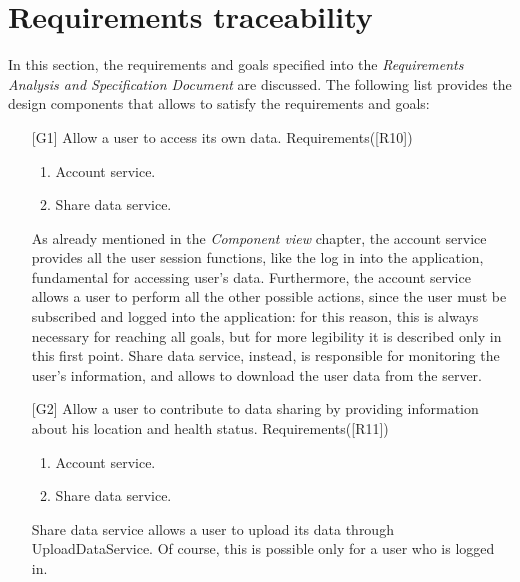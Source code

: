 \section{Requirements traceability}
In this section, the requirements and goals specified into the \textit{Requirements Analysis and Specification Document} are discussed. 
The following list provides the design components that allows to satisfy the requirements and goals: 
\begin{itemize}
\item[{[G1]}] Allow a user to access its own data. Requirements([R10])
	\begin{enumerate}
	\item Account service.
	\item Share data service.
	\end{enumerate}
As already mentioned in the \textit{Component view} chapter, the account service provides all the user session functions, like the log in into
the application, fundamental for accessing user's data. 
Furthermore, the account service allows a user to perform all the other possible actions, since the user must be subscribed and logged into
the application: for this reason, this is always necessary for reaching all goals, but for more legibility it is described only in this first
point. 
Share data service, instead, is responsible for monitoring the user's information, and allows to download the user data from the server.

\item[{[G2]}] Allow a user to contribute to data sharing by providing information about his location and health status. Requirements([R11])
	\begin{enumerate}
	\item Account service.
	\item Share data service.
	\end{enumerate}
Share data service allows a user to upload its data through UploadDataService. 
Of course, this is possible only for a user who is logged in. 


\end{itemize}
